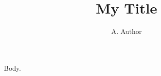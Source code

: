 \documentclass{article}
\author{A. Author}
\makeatletter
\let\orig@title\title
\renewcommand{\title}[1]{\gdef\toc@title{#1}}
\makeatother
\begin{document}
\title{My Title}
\makeatletter\orig@title{\toc@title}\makeatother
\maketitle
Body.
\end{document}
